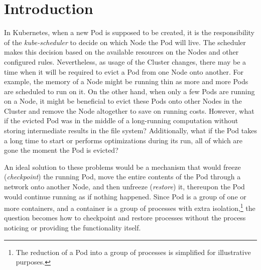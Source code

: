 \documentclass[
  digital,     %
  oneside,     %
  nosansbold,  %
  nocolorbold, %
  lof,         %
  nolot,         %
]{fithesis4}
\begin{document}
\chapter*{Introduction}

In Kubernetes, when a new Pod is supposed to be created, it is the responsibility of the \emph{kube-scheduler} to decide on which Node the Pod will live. The scheduler makes this decision based on the available resources on the Nodes and other configured rules. Nevertheless, as usage of the Cluster changes, there may be a time when it will be required to evict a Pod from one Node onto another. For example, the memory of a Node might be running thin as more and more Pods are scheduled to run on it. On the other hand, when only a few Pods are running on a Node, it might be beneficial to evict these Pods onto other Nodes in the Cluster and remove the Node altogether to save on running costs. However, what if the evicted Pod was in the middle of a long-running computation without storing intermediate results in the file system? Additionally, what if the Pod takes a long time to start or performs optimizations during its run, all of which are gone the moment the Pod is evicted?

An ideal solution to these problems would be a mechanism that would freeze (\emph{checkpoint}) the running Pod, move the entire contents of the Pod through a network onto another Node, and then unfreeze (\emph{restore}) it, thereupon the Pod would continue running as if nothing happened. Since Pod is a group of one or more containers, and a container is a group of processes with extra isolation,\footnote{The reduction of a Pod into a group of processes is simplified for illustrative purposes.} the question becomes how to checkpoint and restore processes without the process noticing or providing the functionality itself.
\end{document}
